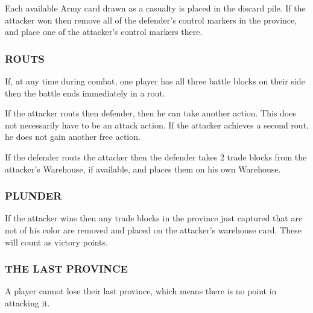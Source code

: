 Each available Army card drawn as a casualty is placed in the discard pile. If the attacker won then remove all of the defender’s control markers in the province, and place one of the attacker's control markers there.

\subsubsection{ROUTS}

If, at any time during combat, one player has all three battle blocks on their side then the battle ends immediately in a rout.

If the attacker routs then defender, then he can take another action. This does not necessarily have to be an attack action. If the attacker achieves a second rout, he does not gain another free action.

If the defender routs the attacker then the defender takes 2 trade blocks from the attacker’s Warehouse, if available, and places them on his own Warehouse.

\subsubsection{PLUNDER}

If the attacker wins then any trade blocks in the province just captured that are not of his color are removed and placed on the attacker’s warehouse card. These will count as victory points.

\subsubsection{THE LAST PROVINCE}

A player cannot lose their last province, which means there is no point in attacking it.
